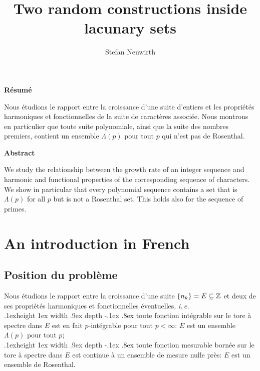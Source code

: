 \documentclass[a4paper]{article}
\title{Two random constructions inside lacunary sets}
\author{Stefan Neuwirth}
\date{}
\def\ie{{\it i.\,e.}\ }
\def\bull{\leavevmode\kern .1ex\vrule height 1ex width .9ex depth
-.1ex \kern .8ex}
\def\bloc{\bull}
\def\se{\subseteq}
\def\Z{\hbox{${\mathbb Z}$}}
\def\T{\hbox{${\mathbb T}$}}
\def\SC#1{\mathscr{C}_{#1}(\T)}
\def\SL#1#2{{\fam0 L}^{#1}_{#2}(\T)}
\def\DL/{\mbox{$\L/\subseteq\Z$}}
\def\DLL/{\mbox{$\L/=\{\lambda_k\}\subseteq\Z$}}
\def\DLLL/{\mbox{$\L/=\{\lambda_k\}_{k\ge1}\subseteq\Z$}}
\begin{document}
\def\set{E}
\def\element{n}
\def\SCL{\SC{\set}}
\def\SLL#1{\SL{#1}{\set}}
\def\SLPL{\SLL{p}}
\def\DL/{$\set\se\Z$}
\def\DLL/{$\set=\{\element_k\}\se\Z$}
\def\DLLL/{$\set=\{\element_k\}_{k\ge1}\se\Z$}

\maketitle

{\leftskip=1cm\rightskip=1cm\small

\begin{center}{\bf R\'esum\'e}\end{center}

Nous \'etudions le rapport entre la
croissance d'une suite d'entiers et les propri\'et\'es harmoniques et
fonctionnelles de la suite de caract\`eres associ\'ee. Nous montrons
en particulier que toute suite polynomiale, ainsi que la suite des
nombres premiers, contient un ensemble $\Lambda(p)$ pour tout $p$ qui
n'est pas de Rosenthal.

\begin{center}{\bf Abstract}\end{center}

We study the relationship between the growth rate
of an integer sequence and harmonic and functional properties of the
corresponding sequence of characters. We show in particular that every
polynomial sequence contains a set that is $\Lambda(p)$ for all $p$
but is not a Rosenthal set. This holds also for the sequence of
primes.

}

\section{An introduction in French}

\subsection{Position du probl\`eme} 

Nous \'etudions le rapport entre la croissance d'une suite
$\{n_k\}=E\se\Z$
et deux de ses propri\'et\'es harmoniques et fonctionnelles
\'eventuelles, \ie \\
\bloc 
toute fonction int\'egrable sur le tore \`a spectre dans $E$ est en fait
$p$-int\'egrable pour tout $p<\infty$: $E$ est un ensemble
$\Lambda(p)$ pour tout $p$;\\
\bloc 
toute fonction mesurable born\'ee sur le tore \`a spectre dans $E$ est continue
\`a un ensemble de mesure nulle pr\`es: $E$ est un ensemble de
Rosenthal.
\end{document}
